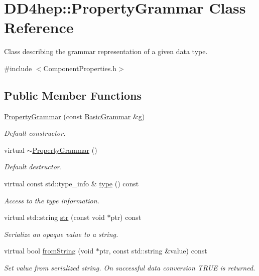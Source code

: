 \hypertarget{class_d_d4hep_1_1_property_grammar}{
\section{DD4hep::PropertyGrammar Class Reference}
\label{class_d_d4hep_1_1_property_grammar}
}


Class describing the grammar representation of a given data type.  


{\ttfamily \#include $<$ComponentProperties.h$>$}\subsection*{Public Member Functions}
\begin{DoxyCompactItemize}
\item 
\hyperlink{class_d_d4hep_1_1_property_grammar_a667cf30a8e7df73005e88e30871716c8}{PropertyGrammar} (const \hyperlink{class_d_d4hep_1_1_basic_grammar}{BasicGrammar} \&g)
\begin{DoxyCompactList}\small\item\em Default constructor. \item\end{DoxyCompactList}\item 
virtual \hyperlink{class_d_d4hep_1_1_property_grammar_a5de8cc9e35a539f8ad254950e6f1f6dc}{$\sim$PropertyGrammar} ()
\begin{DoxyCompactList}\small\item\em Default destructor. \item\end{DoxyCompactList}\item 
virtual const std::type\_\-info \& \hyperlink{class_d_d4hep_1_1_property_grammar_a602f5977dbe746e90b69bc5b6f24f8ee}{type} () const 
\begin{DoxyCompactList}\small\item\em Access to the type information. \item\end{DoxyCompactList}\item 
virtual std::string \hyperlink{class_d_d4hep_1_1_property_grammar_a876ca7bd3ed0fa75bb4abce8a877d569}{str} (const void $\ast$ptr) const 
\begin{DoxyCompactList}\small\item\em Serialize an opaque value to a string. \item\end{DoxyCompactList}\item 
virtual bool \hyperlink{class_d_d4hep_1_1_property_grammar_afe1395246530dea8a90baaf3747ffe5e}{fromString} (void $\ast$ptr, const std::string \&value) const 
\begin{DoxyCompactList}\small\item\em Set value from serialized string. On successful data conversion TRUE is returned. \item\end{DoxyCompactList}\end{DoxyCompactItemize}
